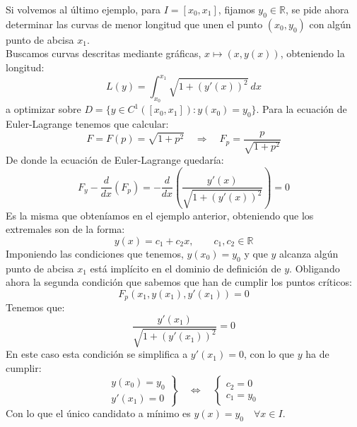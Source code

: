 \begin{ejemplo}
    Si volvemos al último ejemplo, para $I = [x_0,x_1]$, fijamos $y_0\in \mathbb{R}$, se pide ahora determinar las curvas de menor longitud que unen el punto $(x_0,y_0)$ con algún punto de abcisa $x_1$.\\

    \noindent
    Buscamos curvas descritas mediante gráficas, $x\longmapsto (x,y(x))$, obteniendo la longitud:
    \begin{equation*}
        L(y) = \int_{x_0}^{x_1} \sqrt{1+{(y'(x))}^{2}}~dx 
    \end{equation*}
    a optimizar sobre $D = \{y\in C^1([x_0,x_1]):y(x_0) = y_0\}$. Para la ecuación de Euler-Lagrange tenemos que calcular:
    \begin{equation*}
        F = F(p) = \sqrt{1+p^2} \quad\Longrightarrow\quad F_p = \frac{p}{\sqrt{1+p^2}}
    \end{equation*}
    De donde la ecuación de Euler-Lagrange quedaría:
    \begin{equation*}
        F_y - \frac{d}{dx}(F_p) = -\frac{d}{dx}\left(\frac{y'(x)}{\sqrt{1+{(y'(x))}^{2}}}\right) = 0
    \end{equation*}
    Es la misma que obteníamos en el ejemplo anterior, obteniendo que los extremales son de la forma:
    \begin{equation*}
        y(x) = c_1 + c_2x, \qquad c_1,c_2\in \mathbb{R}
    \end{equation*}
    Imponiendo las condiciones que tenemos, $y(x_0) = y_0$ y que $y$ alcanza algún punto de abcisa $x_1$ está implícito en el dominio de definición de $y$. Obligando ahora la segunda condición que sabemos que han de cumplir los puntos críticos:
    \begin{equation*}
        F_p(x_1,y(x_1),y'(x_1)) = 0
    \end{equation*}
    Tenemos que:
    \begin{equation*}
        \frac{y'(x_1)}{\sqrt{1+{(y'(x_1))}^{2}}} = 0
    \end{equation*}
    En este caso esta condición se simplifica a $y'(x_1) = 0$, con lo que $y$ ha de cumplir:
    \begin{equation*}
        \left.\begin{array}{l}
            y(x_0) = y_0 \\
            y'(x_1) = 0
        \end{array}\right\} \quad\Longleftrightarrow\quad \left\{\begin{array}{l}
            c_2 = 0 \\
            c_1 = y_0
        \end{array}\right.
    \end{equation*}
    Con lo que el único candidato a mínimo es $y(x) = y_0 \quad \forall x\in I$.
\end{ejemplo}~\\

